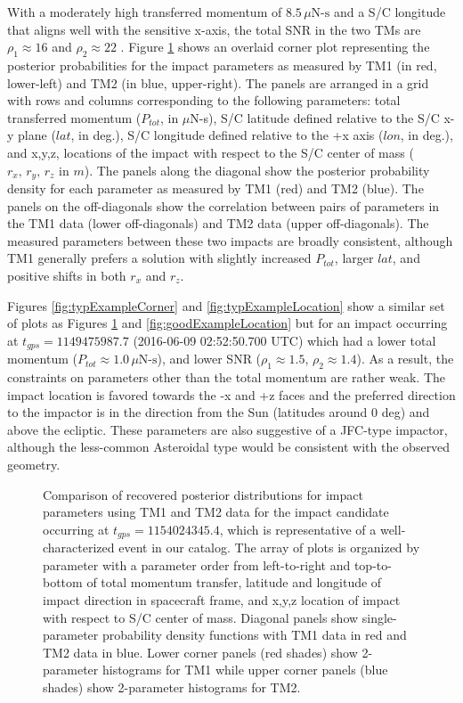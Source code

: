 \documentclass[twocolumn, trackchanges]{aastex62}
\begin{document}
With a moderately high transferred momentum of $8.5\,\mu\textrm{N-s}$ and a S/C longitude that aligns well with the sensitive x-axis, the total SNR in the two TMs are $\rho_1\approx16$ and $\rho_2\approx22$ . Figure \ref{fig:goodExampleCorner} shows an overlaid corner plot representing the posterior probabilities for the impact parameters as measured by TM1 (in red, lower-left) and TM2 (in blue, upper-right).  The panels are arranged in a grid with rows and columns corresponding to the following parameters: total transferred momentum ($P_{tot}$, in $\mu$N-s), S/C latitude defined relative to the S/C x-y plane ($lat$, in deg.), S/C longitude defined relative to the +x axis ($lon$, in deg.), and x,y,z, locations of the impact with respect to the S/C center of mass ($r_x,\,r_y,\,r_z$ in $m$).  The panels along the diagonal show the posterior probability density for each parameter as measured by TM1 (red) and TM2 (blue).  The panels on the off-diagonals show the correlation between pairs of parameters in the TM1 data (lower off-diagonals) and TM2 data (upper off-diagonals). The measured parameters between these two impacts are broadly consistent, although TM1 generally prefers a solution with slightly increased $P_{tot}$, larger $lat$, and positive shifts in both $r_x$ and $r_z$. 

Figures \ref{fig:typExampleCorner} and \ref{fig:typExampleLocation} show a similar set of plots as Figures \ref{fig:goodExampleCorner} and \ref{fig:goodExampleLocation} but for an impact occurring at $t_{gps} = 1149475987.7$ (2016-06-09 02:52:50.700 UTC) which had a lower total momentum ($P_{tot}\approx1.0\,\mu\textrm{N-s}$), and lower SNR ($\rho_1\approx1.5$, $\rho_2\approx1.4$). As a result, the constraints on parameters other than the total momentum are rather weak.  The impact location is favored towards the -x and +z faces and the preferred direction to the impactor is in the direction from the Sun (latitudes around 0 deg) and above the ecliptic. These parameters are also suggestive of a JFC-type impactor, although the less-common Asteroidal type would be consistent with the observed geometry.


\begin{figure}[ht!]
\vspace*{-20mm}
\caption{Comparison of recovered posterior distributions for impact parameters using TM1 and TM2 data for the impact candidate occurring at $t_{gps}=1154024345.4$, which is representative of a well-characterized event in our catalog. The array of plots is organized by parameter with a parameter order from left-to-right and top-to-bottom of total momentum transfer, latitude and longitude of impact direction in  spacecraft frame, and x,y,z location of impact with respect to S/C center of mass. Diagonal panels show single-parameter probability density functions with TM1 data in red and TM2 data in blue. Lower corner panels (red shades) show 2-parameter histograms for TM1 while upper corner panels (blue shades) show 2-parameter histograms for TM2. \label{fig:goodExampleCorner}}
\end{figure}
\end{document}
